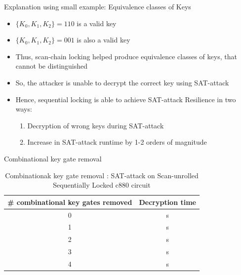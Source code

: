 \begin{frame}{Explanation using small example: Equivalence classes of Keys}
\begin{itemize}
\item $\{K_0, K_1, K_2\}=110$ is a valid key
\item $\{K_0, K_1, K_2\}=001$ is also a valid key
\item Thus, scan-chain locking helped produce equivalence classes of keys, that cannot be distinguished
\item So, the attacker is unable to decrypt the correct key using SAT-attack
\item Hence, sequential locking is able to achieve SAT-attack Resilience in two ways:
	\begin{enumerate}
		\item Decryption of wrong keys during SAT-attack
		\item Increase in SAT-attack runtime by 1-2 orders of magnitude
	\end{enumerate}
\end{itemize}
\end{frame}

\begin{frame}{Combinational key gate removal}
	\begin{table}[!htbp]
		\begin{center}
			\caption{Combinationak key gate removal : SAT-attack on Scan-unrolled Sequentially Locked c880 circuit}
			\label{tab:sat-attack-combinational-key-gate-removal}
			\begin{tabular}{|c|c|}
				\hline
				\# combinational key gates removed & Decryption time \\
				\hline
				0 & s \\
				\hline
				1 & s \\
				\hline
				2 & s \\
				\hline
				3 & s \\
				\hline
				4 & s \\
				\hline
			\end{tabular}
		\end{center}
	\end{table}
\end{frame}
